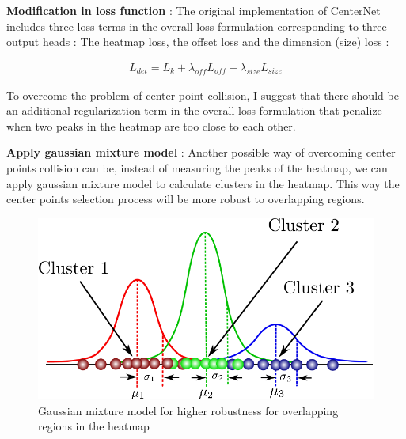 \documentclass[12pt]{article}
\begin{document}
\textbf{Modification in loss function} : The original implementation of CenterNet includes three loss terms in the overall loss formulation corresponding to three output heads : The heatmap loss, the offset loss and the dimension (size) loss :

\begin{align}
 L_{det} = L_k + \lambda_{off}L_{off} + \lambda_{size}L_{size}
\end{align}

To overcome the problem of center point collision, I suggest that there should be an additional regularization term in the overall loss formulation that penalize when two peaks in the heatmap are too close to each other.\newline

\textbf{Apply gaussian mixture model} : Another possible way of overcoming center points collision can be, instead of measuring the peaks of the heatmap, we can apply gaussian mixture model to calculate clusters in the heatmap. This way the center points selection process will be more robust to overlapping regions.

\begin{figure}[H]
    \centering
    \captionsetup{justification=centering}
    \includegraphics[scale=0.5]{images/gmm.png}
    \caption{Gaussian mixture model for higher robustness for overlapping regions in the heatmap}
\end{figure}


 

\end{document}
